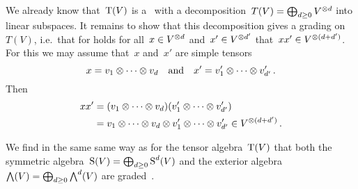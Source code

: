 \section{}





\subsection{}
\label{grading on tensor algebra}

We already know that~$\operatorname{T}(V)$ is a~{\kalg} with a decomposition~$T(V) = \bigoplus_{d \geq 0} V^{\otimes d}$ into linear subspaces.
It remains to show that this decomposition gives a grading on~$T(V)$, i.e.\ that for holds for all~$x \in V^{\otimes d}$ and~$x' \in V^{\otimes d'}$ that~$x x' \in V^{\otimes (d + d')}$.
For this we may assume that~$x$ and~$x'$ are simple tensors
\[
    x
  = v_1 \otimes \dotsb \otimes v_d
  \quad\text{and}\quad
    x'
  = v'_1 \otimes \dotsb \otimes v'_{d'} \,.
\]
Then
\begin{align*}
      x x'
  &=  (v_1 \otimes \dotsb \otimes v_d) (v'_1 \otimes \dotsb \otimes v'_{d'})  \\
  &=  v_1 \otimes \dotsb \otimes v_d \otimes v'_1 \otimes \dotsb \otimes v'_{d'}
  \in V^{\otimes (d + d')} \,.
\end{align*}


\begin{remark}
  We find in the same same way as for the tensor algebra~$\operatorname{T}(V)$ that both the symmetric algebra~$\operatorname{S}(V) = \bigoplus_{d \geq 0} \operatorname{S}^d(V)$ and the exterior algebra~$\bigwedge(V) = \bigoplus_{d \geq 0} \bigwedge^d(V)$ are graded~{\kalgs}.
\end{remark}





\subsection{}

